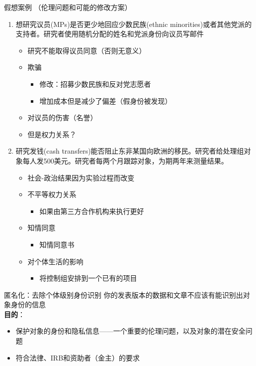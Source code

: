 \documentclass{beamer}
\begin{document}
\begin{frame}{假想案例 （伦理问题和可能的修改方案）}
\begin{enumerate}
    \item 想研究议员(MPs)是否更少地回应少数民族(ethnic minorities)或者其他党派的支持者。研究者使用随机分配的姓名和党派身份向议员写邮件
    \begin{itemize}
        \item <2->研究不能取得议员同意（否则无意义）
        \item <2->欺骗
        \begin{itemize}
            \item <3->修改：招募少数民族和反对党志愿者
            \item <3->增加成本但是减少了偏差（假身份被发现）
        \end{itemize}
        \item <2->对议员的伤害（名誉）
        \item <2->但是权力关系？
    \end{itemize}
    \item <4->研究发钱(cash transfers)能否阻止东非某国向欧洲的移民。研究者给处理组对象每人发500美元。研究者每两个月跟踪对象，为期两年来测量结果。
    \begin{itemize}
        \item <5->社会-政治结果因为实验过程而改变
        \item <5->不平等权力关系
        \begin{itemize}
            \item <6->如果由第三方合作机构来执行更好
        \end{itemize}
        \item <5->知情同意
        \begin{itemize}
            \item <6->知情同意书
        \end{itemize}
        \item <5->对个体生活的影响
        \begin{itemize}
            \item <6->将控制组安排到一个已有的项目
        \end{itemize}
    \end{itemize}
\end{enumerate}
\end{frame}

\begin{frame}{匿名化：去除个体级别身份识别}
\label{deidentify}
你的发表版本的数据和文章不应该有能识别出对象身份的信息\\
\textbf{目的}：
\begin{itemize}
    \item \alert{保护对象的身份和隐私信息}——一个重要的伦理问题，以及对象的潜在安全问题
    \item 符合法律、IRB和资助者（金主）的要求
\end{itemize}
\end{frame}
\end{document}

